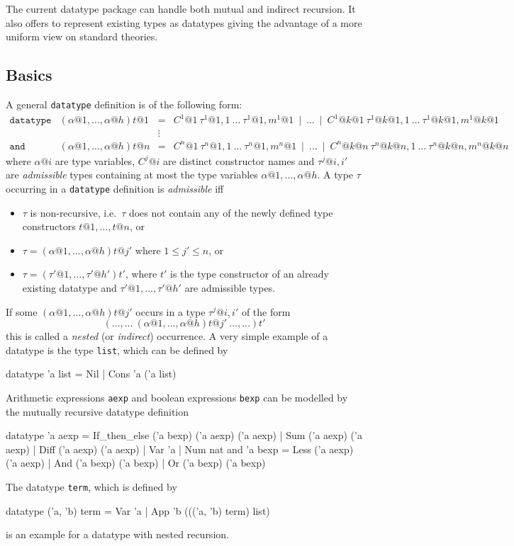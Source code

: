 The current datatype package can handle both mutual and indirect recursion.
It also offers to represent existing types as datatypes giving the advantage
of a more uniform view on standard theories.


\subsection{Basics}
\label{subsec:datatype:basics}

A general \texttt{datatype} definition is of the following form:
\[
\begin{array}{llcl}
\mathtt{datatype} & (\alpha@1,\ldots,\alpha@h)t@1 & = &
  C^1@1~\tau^1@{1,1}~\ldots~\tau^1@{1,m^1@1} ~\mid~ \ldots ~\mid~
    C^1@{k@1}~\tau^1@{k@1,1}~\ldots~\tau^1@{k@1,m^1@{k@1}} \\
 & & \vdots \\
\mathtt{and} & (\alpha@1,\ldots,\alpha@h)t@n & = &
  C^n@1~\tau^n@{1,1}~\ldots~\tau^n@{1,m^n@1} ~\mid~ \ldots ~\mid~
    C^n@{k@n}~\tau^n@{k@n,1}~\ldots~\tau^n@{k@n,m^n@{k@n}}
\end{array}
\]
where $\alpha@i$ are type variables, $C^j@i$ are distinct constructor
names and $\tau^j@{i,i'}$ are {\em admissible} types containing at
most the type variables $\alpha@1, \ldots, \alpha@h$. A type $\tau$
occurring in a \texttt{datatype} definition is {\em admissible} iff
\begin{itemize}
\item $\tau$ is non-recursive, i.e.\ $\tau$ does not contain any of the
newly defined type constructors $t@1,\ldots,t@n$, or
\item $\tau = (\alpha@1,\ldots,\alpha@h)t@{j'}$ where $1 \leq j' \leq n$, or
\item $\tau = (\tau'@1,\ldots,\tau'@{h'})t'$, where $t'$ is
the type constructor of an already existing datatype and $\tau'@1,\ldots,\tau'@{h'}$
are admissible types.
\end{itemize}
If some $(\alpha@1,\ldots,\alpha@h)t@{j'}$ occurs in a type $\tau^j@{i,i'}$
of the form
\[
(\ldots,\ldots ~ (\alpha@1,\ldots,\alpha@h)t@{j'} ~ \ldots,\ldots)t'
\]
this is called a {\em nested} (or \emph{indirect}) occurrence. A very simple
example of a datatype is the type \texttt{list}, which can be defined by
\begin{ttbox}
datatype 'a list = Nil
                 | Cons 'a ('a list)
\end{ttbox}
Arithmetic expressions \texttt{aexp} and boolean expressions \texttt{bexp} can be modelled
by the mutually recursive datatype definition
\begin{ttbox}
datatype 'a aexp = If_then_else ('a bexp) ('a aexp) ('a aexp)
                 | Sum ('a aexp) ('a aexp)
                 | Diff ('a aexp) ('a aexp)
                 | Var 'a
                 | Num nat
and      'a bexp = Less ('a aexp) ('a aexp)
                 | And ('a bexp) ('a bexp)
                 | Or ('a bexp) ('a bexp)
\end{ttbox}
The datatype \texttt{term}, which is defined by
\begin{ttbox}
datatype ('a, 'b) term = Var 'a
                       | App 'b ((('a, 'b) term) list)
\end{ttbox}
is an example for a datatype with nested recursion.

